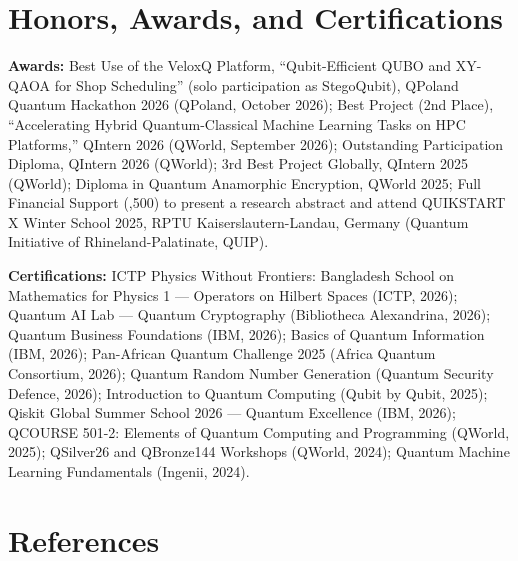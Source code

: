 \documentclass[a4paper,10pt]{article}
\begin{document}
\section*{Honors, Awards, and Certifications}

\textbf{Awards:}
Best Use of the VeloxQ Platform, ``Qubit-Efficient QUBO and XY-QAOA for Shop Scheduling'' (solo participation as StegoQubit), QPoland Quantum Hackathon 2026 (QPoland, October 2026);
Best Project (2nd Place), ``Accelerating Hybrid Quantum-Classical Machine Learning Tasks on HPC Platforms,'' QIntern 2026 (QWorld, September 2026);
Outstanding Participation Diploma, QIntern 2026 (QWorld);
3rd Best Project Globally, QIntern 2025 (QWorld);
Diploma in Quantum Anamorphic Encryption, QWorld 2025;
Full Financial Support (,500) to present a research abstract and attend QUIKSTART X Winter School 2025, RPTU Kaiserslautern-Landau, Germany (Quantum Initiative of Rhineland-Palatinate, QUIP).

\vspace{2pt}

\textbf{Certifications:}
ICTP Physics Without Frontiers: Bangladesh School on Mathematics for Physics 1 --- Operators on Hilbert Spaces (ICTP, 2026);
Quantum AI Lab --- Quantum Cryptography (Bibliotheca Alexandrina, 2026);
Quantum Business Foundations (IBM, 2026);
Basics of Quantum Information (IBM, 2026);
Pan-African Quantum Challenge 2025 (Africa Quantum Consortium, 2026);
Quantum Random Number Generation (Quantum Security Defence, 2026);
Introduction to Quantum Computing (Qubit by Qubit, 2025);
Qiskit Global Summer School 2026 --- Quantum Excellence (IBM, 2026);
QCOURSE 501-2: Elements of Quantum Computing and Programming (QWorld, 2025);
QSilver26 and QBronze144 Workshops (QWorld, 2024);
Quantum Machine Learning Fundamentals (Ingenii, 2024).

\section*{References}
\end{document}
